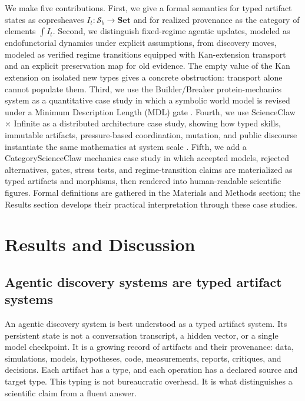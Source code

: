\documentclass[11pt]{article}
\theoremstyle{definition}
\newcommand{\Sschema}{\mathcal{S}}
\newcommand{\Set}{\mathbf{Set}}
\begin{document}
We make five contributions. First, we give a formal semantics for typed artifact states as copresheaves $I_t:\Sschema_b\to\Set$ and for realized provenance as the category of elements $\int I_t$. Second, we distinguish fixed-regime agentic updates, modeled as endofunctorial dynamics under explicit assumptions, from discovery moves, modeled as verified regime transitions equipped with Kan-extension transport and an explicit preservation map for old evidence. The empty value of the Kan extension on isolated new types gives a concrete obstruction: transport alone cannot populate them. Third, we use the Builder/Breaker protein-mechanics system as a quantitative case study in which a symbolic world model is revised under a Minimum Description Length (MDL) gate \citep{buehler_break_world_2026}. Fourth, we use ScienceClaw $\times$ Infinite as a distributed architecture case study, showing how typed skills, immutable artifacts, pressure-based coordination, mutation, and public discourse instantiate the same mathematics at system scale \citep{wang_scienceclaw_infinite_2026}. Fifth, we add a CategoryScienceClaw mechanics case study in which accepted models, rejected alternatives, gates, stress tests, and regime-transition claims are materialized as typed artifacts and morphisms, then rendered into human-readable scientific figures. Formal definitions are gathered in the Materials and Methods section; the Results section develops their practical interpretation through these case studies.

\section{Results and Discussion}
\label{sec:results}

\subsection{Agentic discovery systems are typed artifact systems}
\label{sec:typed_artifact_systems}

An agentic discovery system is best understood as a typed artifact system. Its persistent state is not a conversation transcript, a hidden vector, or a single model checkpoint. It is a growing record of artifacts and their provenance: data, simulations, models, hypotheses, code, measurements, reports, critiques, and decisions. Each artifact has a type, and each operation has a declared source and target type. This typing is not bureaucratic overhead. It is what distinguishes a scientific claim from a fluent answer.
\end{document}
